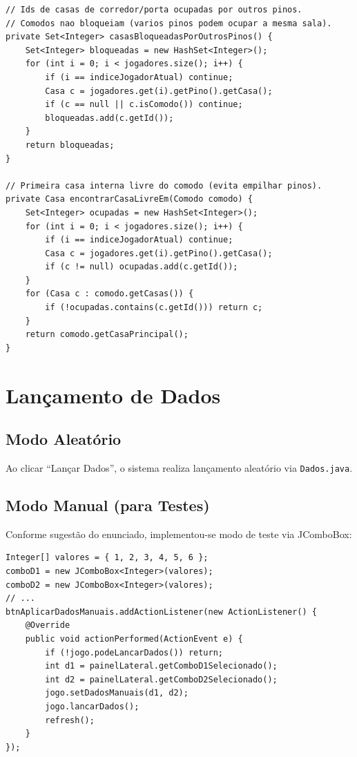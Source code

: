 \documentclass[12pt,a4paper]{report}
\begin{document}
\begin{lstlisting}
// Ids de casas de corredor/porta ocupadas por outros pinos.
// Comodos nao bloqueiam (varios pinos podem ocupar a mesma sala).
private Set<Integer> casasBloqueadasPorOutrosPinos() {
    Set<Integer> bloqueadas = new HashSet<Integer>();
    for (int i = 0; i < jogadores.size(); i++) {
        if (i == indiceJogadorAtual) continue;
        Casa c = jogadores.get(i).getPino().getCasa();
        if (c == null || c.isComodo()) continue;
        bloqueadas.add(c.getId());
    }
    return bloqueadas;
}

// Primeira casa interna livre do comodo (evita empilhar pinos).
private Casa encontrarCasaLivreEm(Comodo comodo) {
    Set<Integer> ocupadas = new HashSet<Integer>();
    for (int i = 0; i < jogadores.size(); i++) {
        if (i == indiceJogadorAtual) continue;
        Casa c = jogadores.get(i).getPino().getCasa();
        if (c != null) ocupadas.add(c.getId());
    }
    for (Casa c : comodo.getCasas()) {
        if (!ocupadas.contains(c.getId())) return c;
    }
    return comodo.getCasaPrincipal();
}
\end{lstlisting}

\section{Lançamento de Dados}

\subsection{Modo Aleatório}

Ao clicar ``Lançar Dados'', o sistema realiza lançamento aleatório via \texttt{Dados.java}.

\subsection{Modo Manual (para Testes)}

Conforme sugestão do enunciado, implementou-se modo de teste via JComboBox:

\begin{lstlisting}
Integer[] valores = { 1, 2, 3, 4, 5, 6 };
comboD1 = new JComboBox<Integer>(valores);
comboD2 = new JComboBox<Integer>(valores);
// ...
btnAplicarDadosManuais.addActionListener(new ActionListener() {
    @Override
    public void actionPerformed(ActionEvent e) {
        if (!jogo.podeLancarDados()) return;
        int d1 = painelLateral.getComboD1Selecionado();
        int d2 = painelLateral.getComboD2Selecionado();
        jogo.setDadosManuais(d1, d2);
        jogo.lancarDados();
        refresh();
    }
});
\end{lstlisting}
\end{document}
